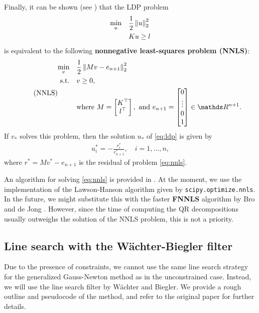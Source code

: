 \documentclass{article}
\numberwithin{equation}{section}
\theoremstyle{nonumberplain}
\begin{document}
Finally, it can be shown (see \cite[chapter 23.4]{LawHan74}) that the LDP problem
\begin{align*}
\min_u \quad &  \frac{1}{2} \left\|u\right\|_2^2 \notag\\
 & Ku \geq l
\end{align*}
is equivalent to the following \textbf{nonnegative least-squares problem (NNLS)}:
\begin{equation}\tag{NNLS}\label{eq:nnls}
\begin{aligned}
\min_v \quad & \frac{1}{2} \norm{Mv - e_{n+1}}_2^2\\
\text{s.t.} \quad & v \geq 0, \\
& \text{where } M = \begin{bmatrix} K^\top \\ l^\top \end{bmatrix}, \text{ and } e_{n+1} = \begin{bmatrix} 0 \\ \vdots \\ 0 \\ 1 \end{bmatrix} \in \R^{n+1}.
\end{aligned}
\end{equation}
If $v_*$ solves this problem, then the solution $u_*$ of \eqref{eq:ldp} is given by
\begin{align*}
u_i^* = - \frac{r_i^*}{r_{n+1}^*}, \quad i=1,\ldots,n,
\end{align*}
where $r^* = M v^*-e_{n+1}$ is the residual of problem \eqref{eq:nnls}.

An algorithm for solving \eqref{eq:nnls} is provided in \cite{LawHan87}. At the moment, we use the implementation of the Lawson-Hanson algorithm given by \texttt{scipy.optimize.nnls}. In the future, we might substitute this with the faster \textbf{FNNLS} algorithm by Bro and de Jong \cite{BroJon97}. However, since the time of computing the QR decompositions usually outweighs the solution of the NNLS problem, this is not a priority.

\subsection{Line search with the Wächter-Biegler filter}

Due to the presence of constraints, we cannot use the same line search strategy for the generalized Gauss-Newton method as in the unconstrained case. Instead, we will use the line search filter by Wächter and Biegler. We provide a rough outline and pseudocode of the method, and refer to the original paper \cite{WaeBie03} for further details.
\end{document}
